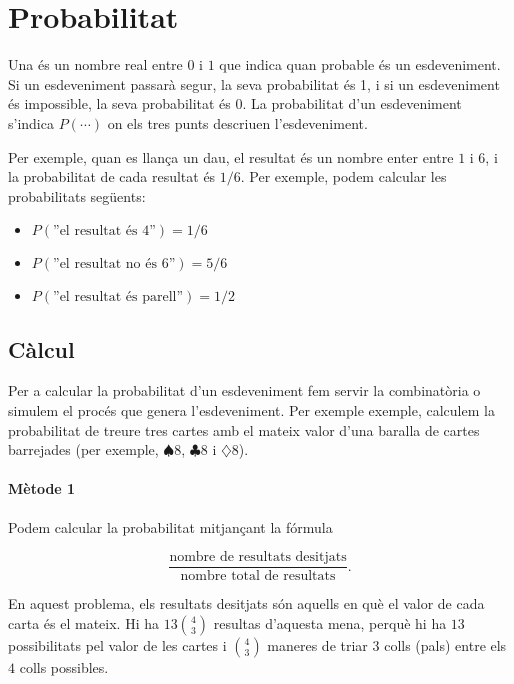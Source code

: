 \chapter{Probabilitat}


Una  és un nombre real entre $0$ i $1$ que indica
quan probable és un esdeveniment.  Si un esdeveniment passarà segur,
la seva probabilitat és 1, i si un esdeveniment és impossible, la seva
probabilitat és 0. La probabilitat d'un esdeveniment s'indica
$P(\cdots)$ on els tres punts descriuen l'esdeveniment.

Per exemple, quan es llança un dau, el resultat és un nombre enter
entre $1$ i $6$, i la probabilitat de cada resultat és $1/6$. Per
exemple, podem calcular les probabilitats següents:


\begin{itemize}[noitemsep]
\item $P(\textrm{''el resultat és 4''})=1/6$
\item $P(\textrm{''el resultat no és 6''})=5/6$
\item $P(\textrm{''el resultat és parell''})=1/2$
\end{itemize}


\section{Càlcul}

Per a calcular la probabilitat d'un esdeveniment fem servir la
combinatòria o simulem el procés que genera l'esdeveniment. Per
exemple exemple, calculem la probabilitat de treure tres cartes amb el
mateix valor d'una baralla de cartes barrejades (per exemple,
$\spadesuit 8$, $\clubsuit 8$ i $\diamondsuit 8$).

\subsubsection*{Mètode 1}

Podem calcular la probabilitat mitjançant la fórmula


\[\frac{\textrm{nombre de resultats desitjats}}{\textrm{nombre total de resultats}}.\]


En aquest problema, els resultats desitjats són aquells en què el
valor de cada carta és el mateix. Hi ha $13 {4 \choose 3}$ resultas
d'aquesta mena, perquè hi ha $13$ possibilitats pel valor de les
cartes i ${4 \choose 3}$ maneres de triar $3$ colls (pals) entre
els $4$ colls possibles.

